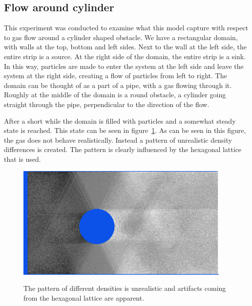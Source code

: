 \documentclass[12pt,a4paper]{article}
\begin{document}
\subsection{Flow around cylinder}
This experiment was conducted to examine what this model capture with respect to gas flow around a cylinder shaped obstacle. We have a rectangular domain, with walls at the top, bottom and left sides. Next to the wall at the left side, the entire strip is a source. At the right side of the domain, the entire strip is a sink. In this way, particles are made to enter the system at the left side and leave the system at the right side, creating a flow of particles from left to right. The domain can be thought of as a part of a pipe, with a gas flowing through it. Roughly at the middle of the domain is a round obstacle, a cylinder going straight through the pipe, perpendicular to the direction of the flow.

After a short while the domain is filled with particles and a somewhat steady state is reached. This state can be seen in figure~\ref{flow1}. As can be seen in this figure, the gas does not behave realistically. Instead a pattern of unrealistic density differences is created. The pattern is clearly influenced by the hexagonal lattice that is used.
\begin{figure}[htp]
\centering
  \includegraphics[width=300pt]{figs/scenario3mathexprintscreen1.png}
\label{flow1}
\caption{The pattern of different densities is unrealistic and artifacts coming from the hexagonal lattice are apparent.}
\end{figure}
\end{document}
